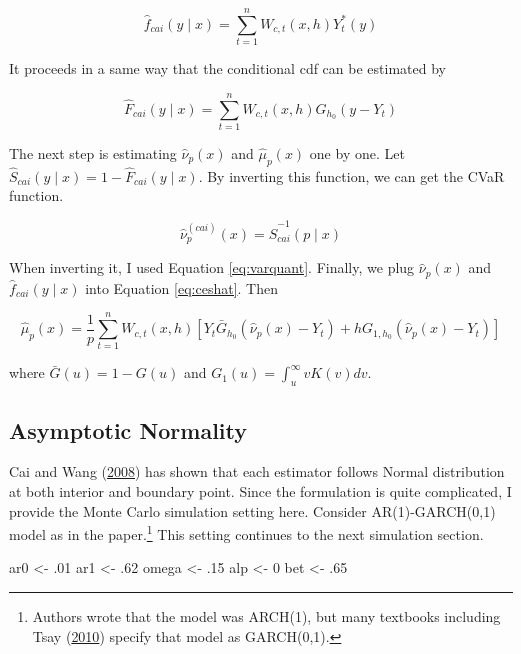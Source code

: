 \documentclass[
]{article}
\newenvironment{Shaded}{\begin{snugshade}}{\end{snugshade}}
\newcommand{\DecValTok}[1]{\textcolor[rgb]{0.00,0.00,0.81}{#1}}
\newcommand{\FloatTok}[1]{\textcolor[rgb]{0.00,0.00,0.81}{#1}}
\newcommand{\NormalTok}[1]{#1}
\newcommand{\StringTok}[1]{\textcolor[rgb]{0.31,0.60,0.02}{#1}}
\theoremstyle{definition}
\theoremstyle{definition}
\theoremstyle{definition}
\theoremstyle{remark}
\begin{document}
\begin{equation}
  \hat{f}_{cai}(y \mid x) = \sum_{t = 1}^n W_{c,t}(x, h) Y_t^{\ast}(y)
  \label{eq:wdkllpdf}
\end{equation}

It proceeds in a same way that the conditional cdf can be estimated by

\begin{equation}
  \hat{F}_{cai}(y \mid x) = \sum_{t = 1}^n W_{c,t}(x, h) G_{h_0}(y - Y_t)
  \label{eq:wdkllcdf}
\end{equation}

The next step is estimating \(\hat\nu_p(x)\) and \(\hat\mu_p(x)\) one by one. Let \(\hat{S}_{cai}(y \mid x) = 1 - \hat{F}_{cai}(y \mid x)\). By inverting this function, we can get the CVaR function.

\begin{equation}
  \hat\nu_p^{(cai)}(x) = \hat{S}_{cai}^{-1}(p \mid x)
  \label{eq:wdkllcvar}
\end{equation}

When inverting it, I used Equation \eqref{eq:varquant}. Finally, we plug \(\hat\nu_p(x)\) and \(\hat{f}_{cai}(y \mid x)\) into Equation \eqref{eq:ceshat}. Then

\begin{equation}
  \hat\mu_p(x) = \frac{1}{p} \sum_{t = 1}^n W_{c,t}(x, h) \left[ Y_t \bar{G}_{h_0} (\hat\nu_p(x) - Y_t) + h G_{1, h_0}(\hat\nu_p(x) - Y_t) \right]
  \label{eq:wdkllces}
\end{equation}

where \(\bar{G}(u) = 1 - G(u)\) and \(G_1(u) = \int_u^\infty v K(v) dv\).

\hypertarget{asymptotic-normality}{%
\subsection{Asymptotic Normality}\label{asymptotic-normality}}

Cai and Wang (\protect\hyperlink{ref-cai:2008aa}{2008}) has shown that each estimator follows Normal distribution at both interior and boundary point. Since the formulation is quite complicated, I provide the Monte Carlo simulation setting here. Consider AR(1)-GARCH(0,1) model as in the paper.\footnote{Authors wrote that the model was ARCH(1), but many textbooks including Tsay (\protect\hyperlink{ref-Tsay:2010aa}{2010}) specify that model as GARCH(0,1).} This setting continues to the next simulation section.

\begin{Shaded}
\begin{Highlighting}[]
\NormalTok{ar0 <{-}}\StringTok{ }\FloatTok{.01}
\NormalTok{ar1 <{-}}\StringTok{ }\FloatTok{.62}
\NormalTok{omega <{-}}\StringTok{ }\FloatTok{.15}
\NormalTok{alp <{-}}\StringTok{ }\DecValTok{0}
\NormalTok{bet <{-}}\StringTok{ }\FloatTok{.65}
\end{Highlighting}
\end{Shaded}
\end{document}
